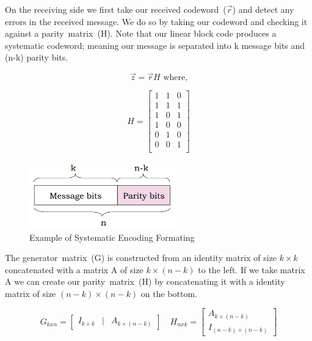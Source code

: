 \documentclass[12pt]{article}
\begin{document}
On the receiving side we first take our received codeword~($\vec{r}$) and 
detect any errors in the received message. We do so by taking our 
codeword and checking it against a parity~matrix~(H). Note that our linear 
block code produces a systematic codeword; meaning our message is separated 
into k message bits and (n-k) parity bits. \cite{Balakrishnan2010} 

\begin{equation}
    \vec{z}=\vec{r}H \text{ where,}
    \label{eq:error_detector}
\end{equation}

$$
    H=
    \begin{bmatrix}
        1 & 1 & 0 \\
        1 & 1 & 1 \\
        1 & 0 & 1 \\
        1 & 0 & 0 \\
        0 & 1 & 0 \\
        0 & 0 & 1 \\
    \end{bmatrix}
$$

\begin{figure}[H]
    \centering
    \includegraphics[width=2.5in]{systematic_encoded.PNG}
    \caption{Example of Systematic Encoding Formating
             \cite{Balakrishnan2010}}
\end{figure}

The generator~matrix~(G) is constructed from an identity matrix of size 
$k\times k$ concatenated with a matrix A of size $k\times (n-k)$ to the 
left. If we take matrix A we can create our parity~matrix~(H) by 
concatenating it with a identity matrix of size $(n-k)\times (n-k)$ on the
bottom.

$$
    G_{kxn}=
    \begin{bmatrix}
        I_{k\times k} & | & A_{k\times (n-k)}
    \end{bmatrix}
    \quad
    H_{nxk}=
    \begin{bmatrix}
        A_{k\times (n-k)} \\ I_{(n-k)\times (n-k)}
    \end{bmatrix}
$$
\end{document}
